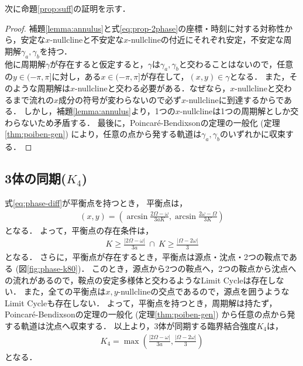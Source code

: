 \documentclass[../main]{subfiles}
\begin{document}
    次に命題\ref{prop:suff}の証明を示す．
    \begin{proof}
        補題\ref{lemma:annulus}と式\eqref{eq:prop-2phase}の座標・時刻に対する対称性から，安定な$x$-nullclineと不安定な$x$-nullclineの付近にそれぞれ安定，不安定な周期解$\gamma_a,\gamma_b$を持つ．\\
        他に周期解$\gamma$が存在すると仮定すると，$\gamma$は$\gamma_a,\gamma_b$と交わることはないので，任意の$y\in(-\pi,\pi]$に対し，ある$x\in(-\pi,\pi]$が存在して，$(x,y)\in\gamma$となる．
        また，そのような周期解は$x$-nullclineと交わる必要がある．なぜなら，$x$-nullclineと交わるまで流れの$x$成分の符号が変わらないので必ず$x$-nullclineに到達するからである．
        しかし，補題\ref{lemma:annulus}より，1つの$x$-nullclineは1つの周期解としか交わらないため矛盾する．
        最後に，Poincaré-Bendixsonの定理の一般化 (定理\ref{thm:poiben-gen}) により，任意の点から発する軌道は$\gamma_a,\gamma_b$のいずれかに収束する．
    \end{proof}

    \subsection{3体の同期($K_4$)}
    \label{sec:3body-k4}
    式\eqref{eq:phase-diff}が平衡点を持つとき，
    平衡点は，
    \begin{align*}
        (x,y)=\left(\arcsin \frac{2\Omega-\omega}{3aK},\arcsin \frac{2\omega-\Omega}{3K}\right)
    \end{align*}
    となる．
    よって，平衡点の存在条件は，
    \begin{align*}
        K\geq \frac{|2\Omega-\omega|}{3a}\ \cap \ K\geq \frac{|\Omega-2\omega|}{3}
    \end{align*}
    となる．
    さらに，平衡点が存在するとき，平衡点は源点・沈点・2つの鞍点である (図\ref{fig:phase-k80})．
    このとき，源点から2つの鞍点へ，2つの鞍点から沈点への流れがあるので，鞍点の安定多様体と交わるようなLimit Cycleは存在しない．
    また，全ての平衡点は$x,y$-nullclineの交点であるので，源点を囲うようなLimit Cycleも存在しない．
    よって，平衡点を持つとき，周期解は持たず，Poincaré-Bendixsonの定理の一般化 (定理\ref{thm:poiben-gen}) から任意の点から発する軌道は沈点へ収束する．
    以上より，3体が同期する臨界結合強度$K_4$は，
    \begin{align*}
        K_4=\max\left(\frac{|2\Omega-\omega|}{3a},\frac{|\Omega-2\omega|}{3}\right)
    \end{align*}
    となる．
    
\end{document}

